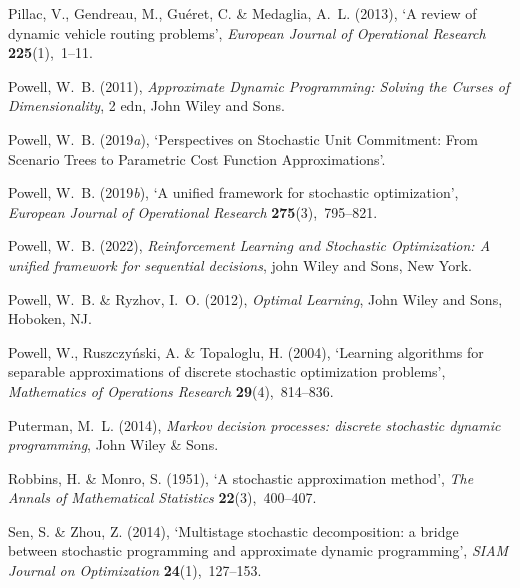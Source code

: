 \documentclass[11pt,oneside,fleqn,reqno,titlepage]{article}
\begin{document}
\begin{thebibliography}{xx}
Pillac, V., Gendreau, M., Gu{\'{e}}ret, C. \& Medaglia, A.~L.  (2013), `{A
  review of dynamic vehicle routing problems}', {\em European Journal of
  Operational Research} {\bf 225}(1),~1--11.

Powell, W.~B.  (2011), {\em {Approximate Dynamic Programming: Solving the
  Curses of Dimensionality}}, 2 edn, John Wiley and Sons.

Powell, W.~B.  (2019{\em a}), `{Perspectives on Stochastic Unit Commitment:
  From Scenario Trees to Parametric Cost Function Approximations}'.

Powell, W.~B.  (2019{\em b}), `A unified framework for stochastic
  optimization', {\em European Journal of Operational Research} {\bf
  275}(3),~795--821.

Powell, W.~B.  (2022), {\em {Reinforcement Learning and Stochastic
  Optimization: A unified framework for sequential decisions}}, john Wiley and
  Sons, New York.

Powell, W.~B. \& Ryzhov, I.~O.  (2012), {\em {Optimal Learning}}, John Wiley
  and Sons, Hoboken, NJ.

Powell, W., Ruszczy{\'n}ski, A. \& Topaloglu, H.  (2004), `Learning algorithms
  for separable approximations of discrete stochastic optimization problems',
  {\em Mathematics of Operations Research} {\bf 29}(4),~814--836.

Puterman, M.~L.  (2014), {\em Markov decision processes: discrete stochastic
  dynamic programming}, John Wiley \& Sons.

Robbins, H. \& Monro, S.  (1951), `{A stochastic approximation method}', {\em
  The Annals of Mathematical Statistics} {\bf 22}(3),~400--407.

Sen, S. \& Zhou, Z.  (2014), `Multistage stochastic decomposition: a bridge
  between stochastic programming and approximate dynamic programming', {\em
  SIAM Journal on Optimization} {\bf 24}(1),~127--153.


\end{thebibliography}
\end{document}
